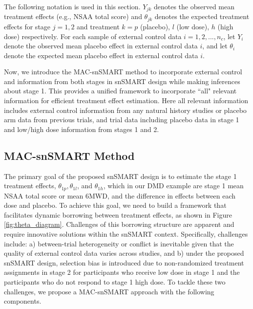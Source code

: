 The following notation is used in this section. $Y_{jk}$ denotes the observed mean treatment effects (e.g., \ac{NSAA} total score) and $\theta_{jk}$ denotes the expected treatment effects for stage $j = 1, 2$ and treatment $k = p$ (placebo), $l$ (low dose), $h$ (high dose) respectively. For each sample of external control data $i = 1, 2, ..., n_c$, let $Y_i$ denote the observed mean placebo effect in external control data $i$, and let $\theta_i$ denote the expected mean placebo effect in external control data $i$. 

Now, we introduce the MAC-snSMART method to incorporate external control and information from both stages in \ac{snSMART} design while making inferences about stage 1. This provides a unified framework to incorporate ``all" relevant information for efficient treatment effect estimation. Here all relevant information includes external control information from any natural history studies or placebo arm data from previous trials, and trial data including placebo data in stage 1 and low/high dose information from stages 1 and 2.

\subsection{MAC-snSMART Method}
The primary goal of the proposed \ac{snSMART} design is to estimate the stage 1 treatment effects, $\theta_{1p}, \theta_{1l}$, and $\theta_{1h}$, which in our \ac{DMD} example are stage 1 mean \ac{NSAA} total score or mean \ac{6MWD}, and the difference in effects between each dose and placebo. To achieve this goal, we need to build a framework that facilitates dynamic borrowing between treatment effects, as shown in Figure \ref{fig:theta_diagram}. Challenges of this borrowing structure are apparent and require innovative solutions within the \ac{snSMART} context. Specifically, challenges include: a)  between-trial heterogeneity or conflict is inevitable given that the quality of external control data varies across studies, and b) under the proposed \ac{snSMART} design, selection bias is introduced due to non-randomized treatment assignments in stage 2 for participants who receive low dose in stage 1 and the participants who do not respond to stage 1 high dose. To tackle these two challenges, we propose a \ac{MAC}-snSMART approach with the following components.

